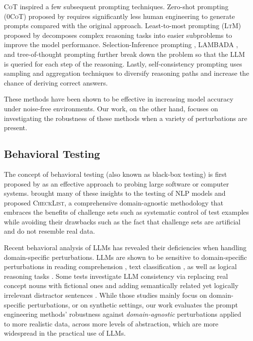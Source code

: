 \documentclass[11pt]{article}
\begin{document}
\textsc{CoT} inspired a few subsequent prompting techniques. Zero-shot prompting (\textsc{0CoT}) proposed by \citet{kojima2023large} requires significantly less human engineering to generate prompts compared with the original approach. Least-to-most prompting (\textsc{LtM}) proposed by \citet{zhou2023leasttomost} decomposes complex reasoning tasks into easier subproblems to improve the model performance. Selection-Inference prompting \cite{creswell2023selectioninference}, LAMBADA \cite{kazemi2023lambada}, and tree-of-thought prompting \cite{yao2023tree} further break down the problem so that the LLM is queried for each step of the reasoning. Lastly, self-consistency prompting \cite{wang2023selfconsistency} uses sampling and aggregation techniques to diversify reasoning paths and increase the chance of deriving correct answers.

These methods have been shown to be effective in increasing model accuracy under noise-free environments. Our work, on the other hand, focuses on investigating the robustness of these methods when a variety of perturbations are present.

\subsection{Behavioral Testing}

The concept of behavioral testing (also known as black-box testing) is first proposed by \citet{536464} as an effective approach to probing large software or computer systems. \citet{ribeiro-etal-2020-beyond} brought many of these insights to the testing of NLP models and proposed \textsc{CheckList}, a comprehensive domain-agnostic methodology that embraces the benefits of challenge sets such as systematic control of test examples \cite{belinkov-glass-2019-analysis} while avoiding their drawbacks such as the fact that challenge sets are artificial and do not resemble real data.

Recent behavioral analysis of LLMs has revealed their deficiencies when handling domain-specific perturbations. LLMs are shown to be sensitive to domain-specific perturbations in reading comprehension \cite{jia-liang-2017-adversarial}, text classification \cite{gan2023sensitivity}, as well as logical reasoning tasks \cite{ye2022unreliability}. Some tests investigate LLM consistency via replacing real concept nouns with fictional ones \cite{saparov2023language} and adding semantically related yet logically irrelevant distractor sentences \cite{saparov2023testing}. While those studies mainly focus on domain-specific perturbations, or on synthetic settings, our work evaluates the prompt engineering methods' robustness against \emph{domain-agnostic} perturbations applied to more realistic data, across more levels of abstraction, which are more widespread in the practical use of LLMs.
\end{document}
